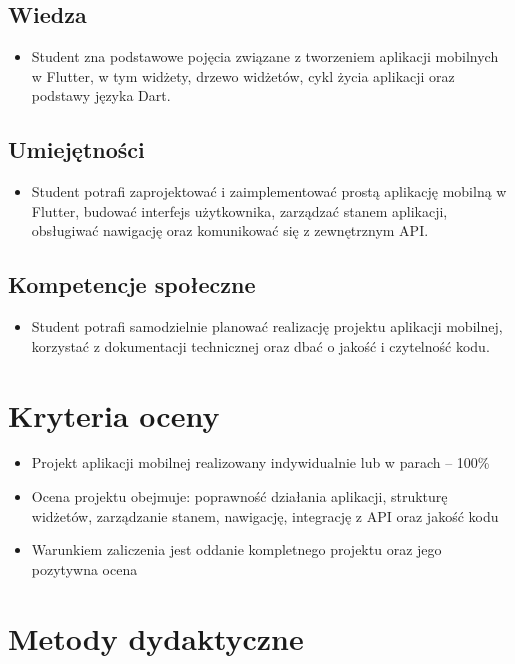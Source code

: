 \documentclass[12pt, a4paper]{article}
\begin{document}
\subsection*{Wiedza}
\begin{itemize}
  \item Student zna podstawowe pojęcia związane z tworzeniem aplikacji mobilnych w Flutter, w tym widżety, drzewo widżetów, cykl życia aplikacji oraz podstawy języka Dart.
\end{itemize}

\subsection*{Umiejętności}
\begin{itemize}
  \item Student potrafi zaprojektować i zaimplementować prostą aplikację mobilną w Flutter, budować interfejs użytkownika, zarządzać stanem aplikacji, obsługiwać nawigację oraz komunikować się z zewnętrznym API.
\end{itemize}

\subsection*{Kompetencje społeczne}
\begin{itemize}
  \item Student potrafi samodzielnie planować realizację projektu aplikacji mobilnej, korzystać z dokumentacji technicznej oraz dbać o jakość i czytelność kodu.
\end{itemize}

\section{Kryteria oceny}

\begin{itemize}
  \item Projekt aplikacji mobilnej realizowany indywidualnie lub w parach – 100\%
  \item Ocena projektu obejmuje: poprawność działania aplikacji, strukturę widżetów, zarządzanie stanem, nawigację, integrację z API oraz jakość kodu
  \item Warunkiem zaliczenia jest oddanie kompletnego projektu oraz jego pozytywna ocena
\end{itemize}

\section{Metody dydaktyczne}
\end{document}
